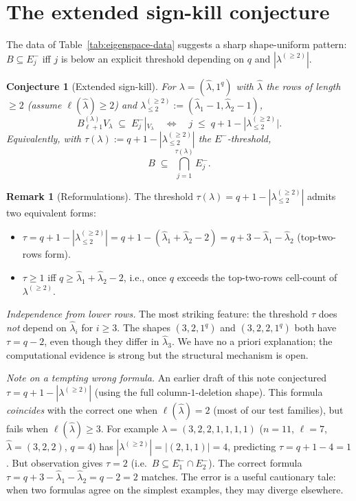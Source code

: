 \documentclass[11pt]{article}
\newtheorem{conjecture}[theorem]{Conjecture}
\theoremstyle{definition}
\newtheorem{remark}[theorem]{Remark}
\newcommand{\Vlam}{V_\lambda}
\newcommand{\Bdec}{B_{\ell+1}^{(\lambda)}}
\newcommand{\hatl}{\widehat\lambda}
\newcommand{\decl}{\lambda^{(\ge 2)}}
\newcommand{\decltwo}{\decl_{\le 2}}
\begin{document}
\section{The extended sign-kill conjecture}\label{sec:conjecture}

The data of Table~\ref{tab:eigenspace-data} suggests a sharp shape-uniform
pattern: $B \subseteq E_j^-$ iff $j$ is below an explicit threshold
depending on $q$ and $|\decl|$.

\begin{conjecture}[Extended sign-kill]\label{conj:ext-sign-kill}
For $\lambda = (\hatl, 1^q)$ with $\hatl$ the rows of length $\ge 2$
(assume $\ell(\hatl) \ge 2$) and $\decltwo := (\hatl_1 - 1, \hatl_2 - 1)$,
\[
   \Bdec \Vlam \;\subseteq\; E_j^-|_{\Vlam}
   \quad \Longleftrightarrow \quad
   j \;\le\; q + 1 - |\decltwo|.
\]
Equivalently, with $\tau(\lambda) := q + 1 - |\decltwo|$ the
\emph{$E^-$-threshold},
\[
   B \;\subseteq\; \bigcap_{j=1}^{\tau(\lambda)} E_j^-.
\]
\end{conjecture}

\begin{remark}[Reformulations]
The threshold $\tau(\lambda) = q + 1 - |\decltwo|$ admits two
equivalent forms:
\begin{itemize}[topsep=0.2em,itemsep=0.1em]
\item $\tau = q + 1 - |\decltwo| = q + 1 - (\hatl_1 + \hatl_2 - 2)
       = q + 3 - \hatl_1 - \hatl_2$ (top-two-rows form).
\item $\tau \ge 1$ iff $q \ge \hatl_1 + \hatl_2 - 2$, i.e., once $q$
exceeds the top-two-rows cell-count of $\decl$.
\end{itemize}

\emph{Independence from lower rows.}  The most striking feature: the
threshold $\tau$ does \emph{not} depend on $\hatl_i$ for $i \ge 3$.
The shapes $(3, 2, 1^q)$ and $(3, 2, 2, 1^q)$ both have $\tau = q - 2$,
even though they differ in $\hatl_3$.  We have no a priori
explanation; the computational evidence is strong but the structural
mechanism is open.

\emph{Note on a tempting wrong formula.}  An earlier draft of this
note conjectured $\tau = q + 1 - |\decl|$ (using the full column-$1$-deletion
shape).  This formula \emph{coincides} with the correct one when
$\ell(\hatl) = 2$ (most of our test families), but fails when
$\ell(\hatl) \ge 3$.  For example $\lambda = (3, 2, 2, 1, 1, 1, 1)$
($n = 11$, $\ell = 7$, $\hatl = (3, 2, 2)$, $q = 4$) has
$|\decl| = |(2, 1, 1)| = 4$, predicting $\tau = q + 1 - 4 = 1$.  But
observation gives $\tau = 2$ (i.e.\ $B \subseteq E_1^- \cap E_2^-$).
The correct formula $\tau = q + 3 - \hatl_1 - \hatl_2 = q - 2 = 2$
matches.  The error is a useful cautionary tale: when two formulas
agree on the simplest examples, they may diverge elsewhere.
\end{remark}
\end{document}
